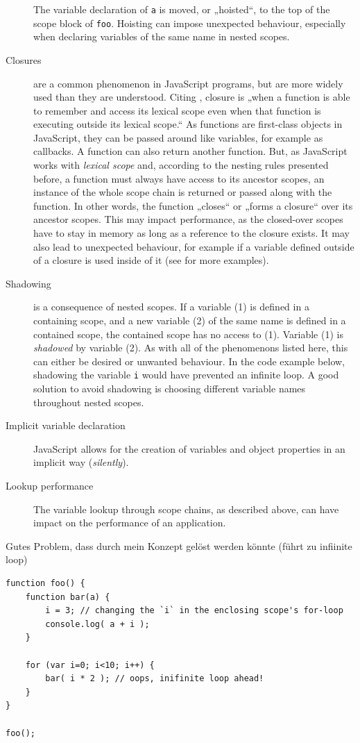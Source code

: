 \begin{description}
The variable declaration of \texttt{a} is moved, or „hoisted“, to the
top of the scope block of \texttt{foo}. Hoisting can impose unexpected
behaviour, especially when declaring variables of the same name in
nested scopes.
\item[Closures]
are a common phenomenon in JavaScript programs, but are more widely used
than they are understood. Citing , closure is „when a
function is able to remember and access its lexical scope even when that
function is executing outside its lexical scope.“ \citeyear{getify} As
functions are first-class objects in JavaScript, they can be passed
around like variables, for example as callbacks. A function can also
return another function. But, as JavaScript works with \emph{lexical
scope} and, according to the nesting rules presented before, a function
must always have access to its ancestor scopes, an instance of the whole
scope chain is returned or passed along with the function. In other
words, the function „closes“ or „forms a closure“ over its ancestor
scopes. This may impact performance, as the closed-over scopes have to
stay in memory as long as a reference to the closure exists. It may also
lead to unexpected behaviour, for example if a variable defined outside
of a closure is used inside of it (see  for
more examples).
\item[Shadowing]
is a consequence of nested scopes. If a variable (1) is defined in a
containing scope, and a new variable (2) of the same name is defined in
a contained scope, the contained scope has no access to (1). Variable
(1) is \emph{shadowed} by variable (2). As with all of the phenomenons
listed here, this can either be desired or unwanted behaviour. In the
code example below, shadowing the variable \texttt{i} would have
prevented an infinite loop. A good solution to avoid shadowing is
choosing different variable names throughout nested scopes.
\item[Implicit variable declaration]
JavaScript allows for the creation of variables and object properties in
an implicit way (\emph{silently}).
\item[Lookup performance]
The variable lookup through scope chains, as described above, can have
impact on the performance of an application.
\end{description}

Gutes Problem, dass durch mein Konzept gelöst werden könnte (führt zu
infiinite loop)

\begin{verbatim}
function foo() {
    function bar(a) {
        i = 3; // changing the `i` in the enclosing scope's for-loop
        console.log( a + i );
    }

    for (var i=0; i<10; i++) {
        bar( i * 2 ); // oops, inifinite loop ahead!
    }
}

foo();
\end{verbatim}
